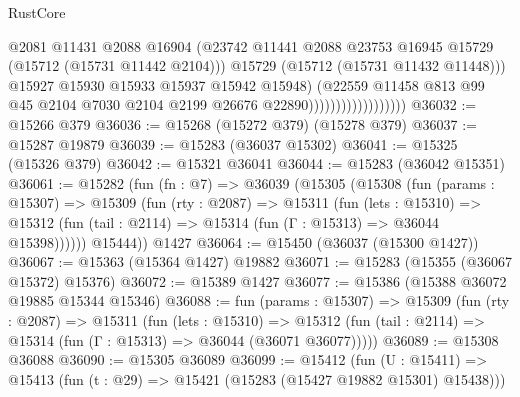 \begin{lexlean}{RustCore}
\begin{coremodule}
                                          @2081
                                          @11431
                                          @2088
                                          @16904
                                          (@23742
                                            @11441
                                            @2088
                                            @23753
                                            @16945
                                            @15729
                                            (@15712 (@15731 @11442 @2104)))
                                          @15729
                                          (@15712 (@15731 @11432 @11448)))
                                        @15927
                                        @15930
                                        @15933
                                        @15937
                                        @15942
                                        @15948)
                                      (@22559
                                        @11458
                                        @813
                                        @99
                                        @45
                                        @2104
                                        @7030
                                        @2104
                                        @2199
                                        @26676
                                        @22890))))))))))))))))))
@36032 := @15266 @379
@36036 := @15268 (@15272 @379) (@15278 @379)
@36037 := @15287 @19879
@36039 := @15283 (@36037 @15302)
@36041 := @15325 (@15326 @379)
@36042 := @15321 @36041
@36044 := @15283 (@36042 @15351)
@36061 := @15282
    (fun (fn : @7) =>
    @36039
      (@15305
        (@15308
          (fun (params : @15307) =>
          @15309
            (fun (rty : @2087) =>
            @15311
              (fun (lets : @15310) =>
              @15312 (fun (tail : @2114) => @15314 (fun (Γ : @15313) => @36044 @15398))))))
        @15444))
    @1427
@36064 := @15450 (@36037 (@15300 @1427))
@36067 := @15363 (@15364 @1427) @19882
@36071 := @15283 (@15355 (@36067 @15372) @15376)
@36072 := @15389 @1427
@36077 := @15386 (@15388 @36072 @19885 @15344 @15346)
@36088 := fun (params : @15307) =>
  @15309
    (fun (rty : @2087) =>
    @15311
      (fun (lets : @15310) =>
      @15312 (fun (tail : @2114) => @15314 (fun (Γ : @15313) => @36044 (@36071 @36077)))))
@36089 := @15308 @36088
@36090 := @15305 @36089
@36099 := @15412
    (fun (U : @15411) => @15413 (fun (t : @29) => @15421 (@15283 (@15427 @19882 @15301) @15438)))

\end{coremodule}
\end{lexlean}
